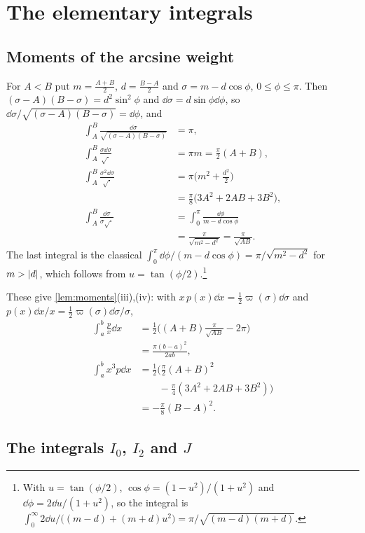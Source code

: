 \section{The elementary integrals}\label{app:integrals}

\subsection{Moments of the arcsine weight}

For $A<B$ put $m=\frac{A+B}2$, $d=\frac{B-A}2$ and
$\sigma=m-d\cos\phi$, $0\le\phi\le\pi$. Then
$(\sigma-A)(B-\sigma)=d^2\sin^2\phi$ and $\dd\sigma=d\sin\phi\dd\phi$, so
$\dd\sigma/\sqrt{(\sigma-A)(B-\sigma)}=\dd\phi$, and
\begin{align*}
\int_A^B\frac{\dd\sigma}{\sqrt{(\sigma-A)(B-\sigma)}}&=\pi,\\
\int_A^B\frac{\sigma\dd\sigma}{\sqrt\cdot}&=\pi m=\frac\pi2(A+B),\\
\int_A^B\frac{\sigma^2\dd\sigma}{\sqrt\cdot}&=\pi\Big(m^2+\frac{d^2}2\Big)\\
&=\frac\pi8\big(3A^2+2AB+3B^2\big),\\
\int_A^B\frac{\dd\sigma}{\sigma\sqrt\cdot}&=\int_0^\pi\frac{\dd\phi}{m-d\cos\phi}\\
&=\frac\pi{\sqrt{m^2-d^2}}=\frac\pi{\sqrt{AB}} .
\end{align*}
The last integral is the classical $\int_0^\pi\dd\phi/(m-d\cos\phi)=\pi/\sqrt{m^2-d^2}$
for $m>\left|d\right|$, which follows from $u=\tan(\phi/2)$.\footnote{With
$u=\tan(\phi/2)$, $\cos\phi=(1-u^2)/(1+u^2)$ and $\dd\phi=2\dd u/(1+u^2)$, so
the integral is $\int_0^\infty2\dd u/\big((m-d)+(m+d)u^2\big)
=\pi/\sqrt{(m-d)(m+d)}$.}

These give \cref{lem:moments}(iii),(iv): with
$x\,p(x)\dd x=\frac12\varpi(\sigma)\dd\sigma$ and
$p(x)\dd x/x=\frac12\varpi(\sigma)\dd\sigma/\sigma$,
\begin{align*}
\int_a^b\frac{p}x\dd x&=\frac12\Big((A+B)\frac\pi{\sqrt{AB}}-2\pi\Big)\\
&=\frac{\pi(b-a)^2}{2ab},\\
\int_a^bx^3p\dd x&=\frac12\Big(\frac\pi2(A+B)^2\\
&\qquad-\frac\pi4(3A^2+2AB+3B^2)\Big)\\
&=-\frac\pi8(B-A)^2 .
\end{align*}

\subsection{The integrals $I_0$, $I_2$ and $J$}

